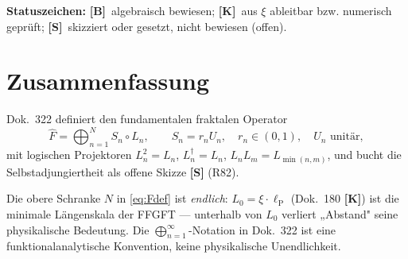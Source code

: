 
\providecommand{\K}{}\renewcommand{\K}{\textbf{[K]}}
\providecommand{\B}{}\renewcommand{\B}{\textbf{[B]}}
\renewcommand{\S}{\textbf{[S]}}
\providecommand{\lP}{}\renewcommand{\lP}{\ell_{\mathrm{P}}}
\providecommand{\mP}{}\renewcommand{\mP}{m_{\mathrm{P}}}
\providecommand{\Lnull}{}\renewcommand{\Lnull}{L_0}
\providecommand{\Fhat}{}\renewcommand{\Fhat}{\hat{F}}
\providecommand{\Hcal}{}\renewcommand{\Hcal}{\mathcal{H}}
\providecommand{\Dcal}{}\renewcommand{\Dcal}{\mathcal{D}}


\noindent\textbf{Statuszeichen:} \B\ algebraisch bewiesen; \K\ aus $\xi$ ableitbar bzw. numerisch geprüft; \S\ skizziert oder gesetzt, nicht bewiesen (offen).

\section*{Zusammenfassung}

Dok.~322 definiert den fundamentalen fraktalen Operator
\begin{equation}
  \Fhat = \bigoplus_{n=1}^{N} S_n \circ L_n,
  \qquad S_n = r_n U_n,\quad r_n \in (0,1),\quad U_n \text{ unitär},
  \label{eq:Fdef}
\end{equation}
mit logischen Projektoren $L_n^2 = L_n$, $L_n^\dagger = L_n$,
$L_nL_m = L_{\min(n,m)}$, und bucht die Selbstadjungiertheit als
offene Skizze \textbf{[S]} (R82).

Die obere Schranke $N$ in \eqref{eq:Fdef} ist \emph{endlich}:
$\Lnull = \xi\cdot\lP$ (Dok.~180 \K) ist die minimale Längenskala
der FFGFT — unterhalb von $\Lnull$ verliert „Abstand" seine
physikalische Bedeutung.
Die $\bigoplus_{n=1}^\infty$-Notation in Dok.~322 ist eine
funktionalanalytische Konvention, keine physikalische Unendlichkeit.

